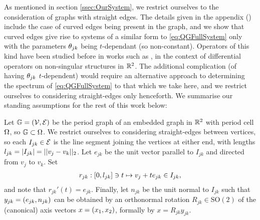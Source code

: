As mentioned in section \ref{ssec:OurSystem}, we restrict ourselves to the consideration of graphs with straight edges.
The details given in the appendix () include the case of curved edges being present in the graph, and we show that curved edges give rise to systems of a similar form to \eqref{eq:QGFullSystem} only with the parameters $\theta_{jk}$ being $t$-dependant (so non-constant).
Operators of this kind have been studied before in works such as \cite{shterenberg2007homogenization}, in the context of differential operators on non-singular structures in $\mathbb{R}^2$.
The additional complication (of having $\theta_{jk}$ $t$-dependent) would require an alternative approach to determining the spectrum of \eqref{eq:QGFullSystem} to that which we take here, and we restrict ourselves to considering straight-edges only henceforth.
We summarise our standing assumptions for the rest of this work below:
\begin{assumption} \label{ass:MeasTheoryProblemSetup}
	Let $\mathbb{G}=\left( \mathcal{V},\mathcal{E} \right)$ be the period graph of an embedded graph in $\mathbb{R}^2$ with period cell $\Omega$, so $\mathbb{G}\subset\Omega$.
	We restrict ourselves to considering straight-edges between vertices, so each $I_{jk}\in \mathcal{E}$ is the line segment joining the vertices at either end, with lengths $l_{jk} = \left\lvert I_{jk} \right\rvert = \lvert\lvert v_j-v_k \rvert\rvert_2$.
	Let $e_{jk}$ be the unit vector parallel to $I_{jk}$ and directed from $v_j$ to $v_k$.
	Set
	\begin{align} \label{eq:EdgeParameterisation}
	r_{jk}:\left[ 0, l_{jk} \right] \ni t \mapsto v_j + te_{jk} \in I_{jk},
	\end{align}
	and note that $r_{jk}'(t) = e_{jk}$.
	Finally, let $n_{jk}$ be the unit normal to $I_{jk}$ such that $y_{jk} = \left( e_{jk}, n_{jk} \right)$ can be obtained by an orthonormal rotation $R_{jk}\in\mathrm{SO}(2)$ of the (canonical) axis vectors $x = \left( x_1, x_2 \right)$, formally by $x = R_{jk}y_{jk}$.
\end{assumption}

